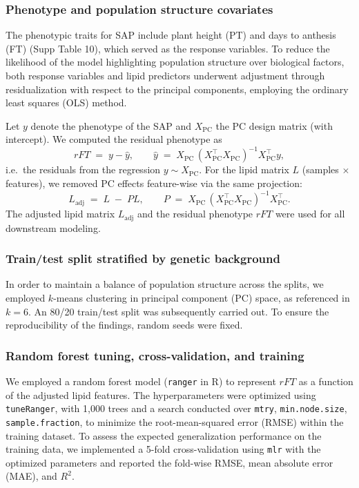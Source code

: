 \documentclass[10pt,letterpaper]{article}
\begin{document}
\begin{itemize}
\subsubsection*{Phenotype and population structure covariates}
The phenotypic traits for SAP include plant height (PT) and days to anthesis (FT) (Supp Table 10), which served as the response variables. To reduce the likelihood of the model highlighting population structure over biological factors, both response variables and lipid predictors underwent adjustment through residualization with respect to the principal components, employing the ordinary least squares (OLS) method.

Let \(y\) denote the phenotype of the SAP and \(X_{\mathrm{PC}}\) the PC design matrix (with intercept). We computed the residual phenotype as
\[
rFT \;=\; y - \hat{y}, 
\qquad 
\hat{y} \;=\; X_{\mathrm{PC}}\,(X_{\mathrm{PC}}^{\top}X_{\mathrm{PC}})^{-1}X_{\mathrm{PC}}^{\top}y,
\]
i.e.\ the residuals from the regression \(y \sim X_{\mathrm{PC}}\).
For the lipid matrix \(L\) (samples \(\times\) features), we removed PC effects feature-wise via the same projection:
\[
L_{\mathrm{adj}} \;=\; L \;-\; P L,
\qquad
P \;=\; X_{\mathrm{PC}}\,(X_{\mathrm{PC}}^{\top}X_{\mathrm{PC}})^{-1}X_{\mathrm{PC}}^{\top}.
\]
The adjusted lipid matrix \(L_{\mathrm{adj}}\) and the residual phenotype \(rFT\) were used for all downstream modeling.

\subsubsection*{Train/test split stratified by genetic background}
In order to maintain a balance of population structure across the splits, we employed \(k\)-means clustering in principal component (PC) space, as referenced in \(k=6\). An 80/20 train/test split was subsequently carried out. To ensure the reproducibility of the findings, random seeds were fixed.

\subsubsection*{Random forest tuning, cross-validation, and training}
We employed a random forest model (\texttt{ranger} in R) to represent \(rFT\) as a function of the adjusted lipid features. The hyperparameters were optimized using \texttt{tuneRanger}, with 1,000 trees and a search conducted over \texttt{mtry}, \texttt{min.node.size}, \texttt{sample.fraction}, to minimize the root-mean-squared error (RMSE) within the training dataset. To assess the expected generalization performance on the training data, we implemented a 5-fold cross-validation using \texttt{mlr} with the optimized parameters and reported the fold-wise RMSE, mean absolute error (MAE), and \(R^2\).


\end{itemize}
\end{document}
